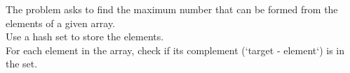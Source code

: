\documentclass[preview]{standalone}
\begin{document}
The problem asks to find the maximum number that can be formed from the elements of a given array.\\Use a hash set to store the elements.\\For each element in the array, check if its complement (`target - element`) is in the set.\\
\end{document}
